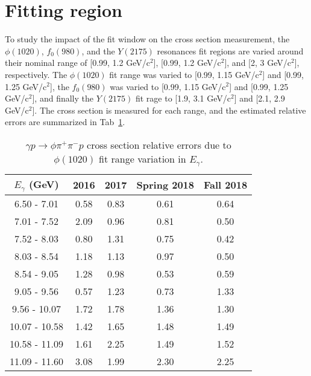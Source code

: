 \section{Fitting region}

To study the impact of the fit window on the cross section measurement, the $\phi(1020)$, $f_{0}(980)$, and the $Y(2175)$  resonances fit regions are varied around their nominal range of [0.99, 1.2 GeV/c$^2$], [0.99, 1.2 GeV/c$^2$], and [2, 3 GeV/c$^2$], respectively. The $\phi(1020)$ fit range was varied to [0.99, 1.15 GeV/c$^2$] and [0.99, 1.25 GeV/c$^2$], the $f_{0}(980)$ was varied to [0.99, 1.15 GeV/c$^2$] and [0.99, 1.25 GeV/c$^2$], and finally the $Y(2175)$ fit rage to [1.9, 3.1 GeV/c$^2$] and [2.1, 2.9 GeV/c$^2$]. The cross section is measured for each range, and the estimated relative errors are summarized in Tab~\ref{tab.syserr.5.2.1}.

\begin{table}[!htbp]
    \centering
    \caption{$\gamma p \rightarrow \phi \pi^{+} \pi^{-} p$ cross section relative errors due to $\phi(1020)$ fit range variation in $E_{\gamma}$.}
    \label{tab.syserr.5.2.1}
    \begin{tabular}{|c|c|c|c|c|}
        \hline
        $E_{\gamma}$ (GeV) & 2016 & 2017 & Spring 2018 & Fall 2018 \\
        \hline
        6.50 - 7.01 & 0.58 & 0.83 & 0.61 & 0.64 \\
        7.01 - 7.52 & 2.09 & 0.96 & 0.81 & 0.50 \\
        7.52 - 8.03 & 0.80 & 1.31 & 0.75 & 0.42 \\
        8.03 - 8.54 & 1.18 & 1.13 & 0.97 & 0.50 \\
        8.54 - 9.05 & 1.28 & 0.98 & 0.53 & 0.59 \\
        9.05 - 9.56 & 0.57 & 1.23 & 0.73 & 1.33 \\
        9.56 - 10.07 & 1.72 & 1.78 & 1.36 & 1.30 \\
        10.07 - 10.58 & 1.42 & 1.65 & 1.48 & 1.49 \\
        10.58 - 11.09 & 1.61 & 2.25 & 1.49 & 1.52 \\
        11.09 - 11.60 & 3.08 & 1.99 & 2.30 & 2.25 \\
        \hline
    \end{tabular}
\end{table}

